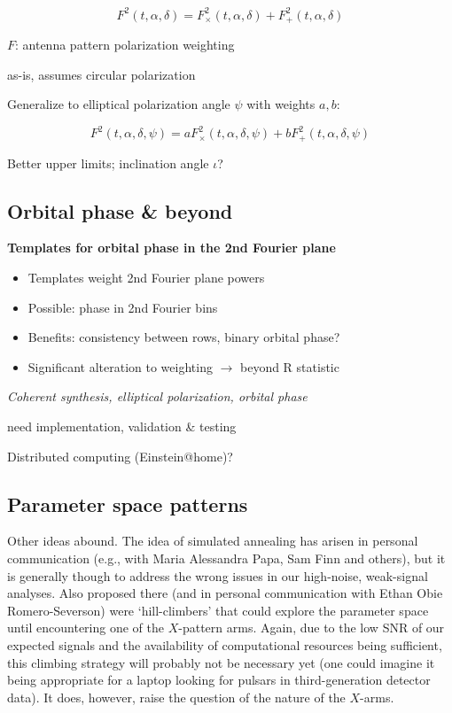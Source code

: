 \begin{equation}
F^{2}(t,\alpha,\delta)=F_{\times}^{2}(t,\alpha,\delta)+F_{+}^{2}(t,\alpha,\delta)
\label{TwoSpect_pol_powers}
\end{equation}



$F$: antenna pattern polarization weighting 


as-is, assumes circular polarization


Generalize to elliptical polarization angle $\psi$ with weights $a,b$:


\begin{equation}
F^{2}(t,\alpha,\delta,\psi)=aF_{\times}^{2}(t,\alpha,\delta,\psi)+bF_{+}^{2}(t,\alpha,\delta,\psi)
\label{TwoSpect_elliptical_pol}
\end{equation}



Better upper limits; inclination angle $\iota$?


\subsection{Orbital phase \& beyond}


\textbf{Templates for orbital phase in the 2nd Fourier plane}
\begin{itemize}
\item Templates weight 2nd Fourier plane powers
\item Possible: phase in 2nd Fourier bins
\item Benefits: consistency between rows, binary orbital phase?
\item Significant alteration to weighting $\rightarrow$ beyond R statistic
\end{itemize}

\emph{Coherent synthesis, elliptical polarization, orbital phase}


need implementation, validation \& testing


Distributed computing (Einstein@home)?


\subsection{Parameter space patterns}
Other ideas abound. The idea of simulated annealing has arisen in personal communication (e.g., with Maria Alessandra Papa, Sam Finn and others), but it is generally though to address the wrong issues in our high-noise, weak-signal analyses. Also proposed there (and in personal communication with Ethan Obie Romero-Severson) were `hill-climbers' that could explore the parameter space until encountering one of the $X$-pattern arms. Again, due to the low SNR of our expected signals and the availability of computational resources being sufficient, this climbing strategy will probably not be necessary yet (one could imagine it being appropriate for a laptop looking for pulsars in third-generation detector data). It does, however, raise the question of the nature of the $X$-arms.

